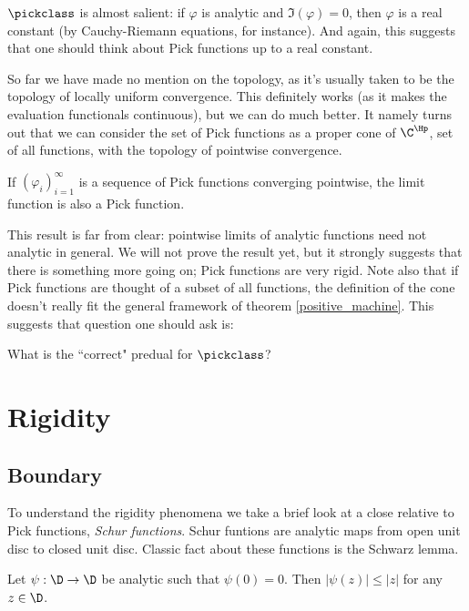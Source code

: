 $\pickclass$ is almost salient: if $\varphi$ is analytic and $\Im(\varphi) = 0$, then $\varphi$ is a real constant (by Cauchy-Riemann equations, for instance). And again, this suggests that one should think about Pick functions up to a real constant.

So far we have made no mention on the topology, as it's usually taken to be the topology of locally uniform convergence. This definitely works (as it makes the evaluation functionals continuous), but we can do much better. It namely turns out that we can consider the set of Pick functions as a proper cone of $\C^{\Hp}$, set of all functions, with the topology of pointwise convergence.

\begin{prop}\label{pick_convergence}
	If $(\varphi_{i})_{i = 1}^{\infty}$ is a sequence of Pick functions converging pointwise, the limit function is also a Pick function.
\end{prop}

This result is far from clear: pointwise limits of analytic functions need not analytic in general. We will not prove the result yet, but it strongly suggests that there is something more going on; Pick functions are very rigid. Note also that if Pick functions are thought of a subset of all functions, the definition of the cone doesn't really fit the general framework of theorem \ref{positive_machine}. This suggests that question one should ask is:

\begin{quest}\label{pick_predual}
	What is the ``correct" predual for $\pickclass$?
\end{quest}


\section{Rigidity}

\subsection{Boundary}

To understand the rigidity phenomena we take a brief look at a close relative to Pick functions, \textit{Schur functions}. Schur funtions are analytic maps from open unit disc to closed unit disc. Classic fact about these functions is the Schwarz lemma.

\begin{lause}
	Let $\psi : \D \to \D$ be analytic such that $\psi(0) = 0$. Then $|\psi(z)| \leq |z|$ for any $z \in \D$.
\end{lause}

